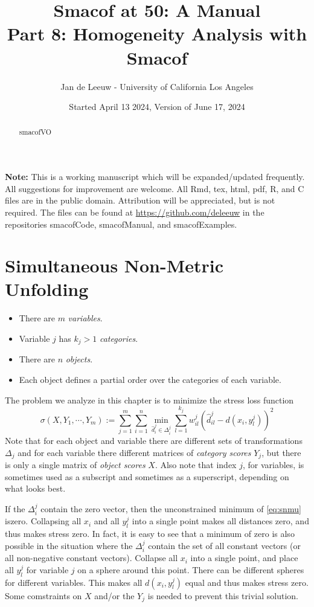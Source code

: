 \documentclass[
  12pt,
]{article}
\title{Smacof at 50: A Manual\\
Part 8: Homogeneity Analysis with Smacof}
\author{Jan de Leeuw - University of California Los Angeles}
\date{Started April 13 2024, Version of June 17, 2024}
\providecommand{\tightlist}{%
  \setlength{\itemsep}{0pt}\setlength{\parskip}{0pt}}
\begin{document}
\maketitle
\begin{abstract}
smacofVO
\end{abstract}

{
\setcounter{tocdepth}{3}
\tableofcontents
}
\textbf{Note:} This is a working manuscript which will be expanded/updated
frequently. All suggestions for improvement are welcome. All Rmd, tex,
html, pdf, R, and C files are in the public domain. Attribution will be
appreciated, but is not required. The files can be found at
\url{https://github.com/deleeuw} in the repositories smacofCode, smacofManual,
and smacofExamples.

\section{Simultaneous Non-Metric Unfolding}\label{snmu}

\begin{itemize}
\tightlist
\item
  There are \(m\) \emph{variables}.
\item
  Variable \(j\) has \(k_j>1\) \emph{categories}.
\item
  There are \(n\) \emph{objects}.
\item
  Each object defines a partial order over the categories of each variable.
\end{itemize}

The problem we analyze in this chapter is to minimize the stress loss function
\begin{equation}
\sigma(X,Y_1,\cdots,Y_m):=\sum_{j=1}^m\sum_{i=1}^n\min_{\hat d_i^j\in\Delta_i^j}\sum_{l=1}^{k_j}w_{il}^j(\hat d_{il}^j-d(x_i,y_l^j))^2
\label{eq:snmu}
\end{equation}
Note that for each object and variable there are different sets of transformations \(\Delta_j\)
and for each variable there different matrices of \emph{category scores} \(Y_j\), but there is only a single matrix of \emph{object scores} \(X\). Also note that index \(j\), for variables, is sometimes used as a subscript and sometimes as a superscript, depending on what looks best.

If the \(\Delta_i^j\) contain the zero vector, then the unconstrained minimum of \eqref{eq:snmu} iszero. Collapsing all \(x_i\) and all \(y_l^j\) into a single point makes all distances zero, and thus makes stress zero.
In fact, it is easy to see that a minimum of zero is also possible in the situation where the \(\Delta_i^j\) contain the
set of all constant vectors (or all non-negative constant vectors). Collapse all
\(x_i\) into a single point, and place all \(y_l^j\) for variable \(j\) on a sphere around this point. There can be different spheres for different variables. This makes all \(d(x_i,y_l^j)\) equal and thus makes stress zero.
Some comstraints on \(X\) and/or the \(Y_j\) is needed to prevent this trivial solution.
\end{document}
